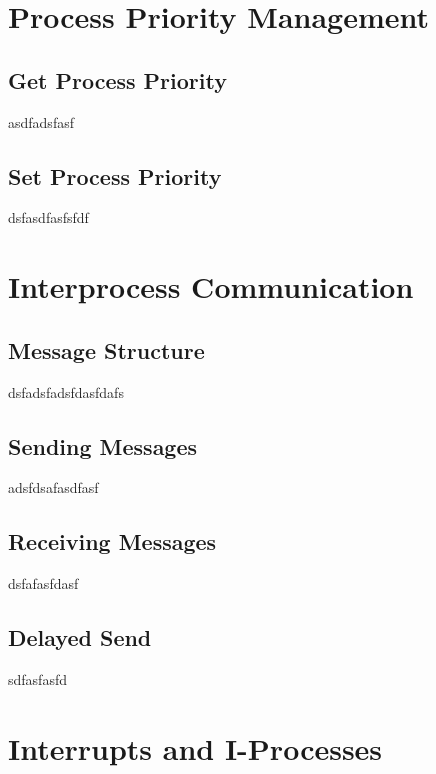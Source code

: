 \documentclass[12pt]{report}
\begin{document}

\section{Process Priority Management}

\subsection{Get Process Priority}

asdfadsfasf

\subsection{Set Process Priority}

dsfasdfasfsfdf


\section{Interprocess Communication}

\subsection{Message Structure}

dsfadsfadsfdasfdafs

\subsection{Sending Messages}

adsfdsafasdfasf

\subsection{Receiving Messages}

dsfafasfdasf

\subsection{Delayed Send}


sdfasfasfd


\section{Interrupts and I-Processes}
\end{document}
